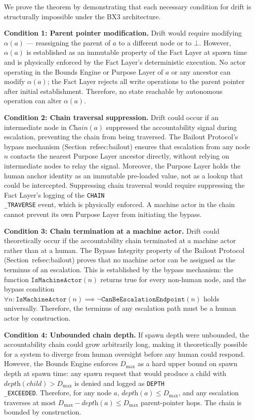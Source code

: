 \begin{Proof}
We prove the theorem by demonstrating that each necessary condition for drift is structurally impossible under the BX3 architecture.

\textbf{Condition 1: Parent pointer modification.} Drift would require modifying $\alpha(a)$ — reassigning the parent of $a$ to a different node or to $\bot$. However, $\alpha(a)$ is established as an immutable property of the Fact Layer at spawn time and is physically enforced by the Fact Layer's deterministic execution. No actor operating in the Bounds Engine or Purpose Layer of $a$ or any ancestor can modify $\alpha(a)$; the Fact Layer rejects all write operations to the parent pointer after initial establishment. Therefore, no state reachable by autonomous operation can alter $\alpha(a)$.

\textbf{Condition 2: Chain traversal suppression.} Drift could occur if an intermediate node in $\textit{Chain}(a)$ suppressed the accountability signal during escalation, preventing the chain from being traversed. The Bailout Protocol's bypass mechanism (Section~ref{sec:bailout}) ensures that escalation from any node $n$ contacts the nearest Purpose Layer ancestor directly, without relying on intermediate nodes to relay the signal. Moreover, the Purpose Layer holds the human anchor identity as an immutable pre-loaded value, not as a lookup that could be intercepted. Suppressing chain traversal would require suppressing the Fact Layer's logging of the \texttt{CHAIN\\_TRAVERSE} event, which is physically enforced. A machine actor in the chain cannot prevent its own Purpose Layer from initiating the bypass.

\textbf{Condition 3: Chain termination at a machine actor.} Drift could theoretically occur if the accountability chain terminated at a machine actor rather than at a human. The Bypass Integrity property of the Bailout Protocol (Section~ref{sec:bailout}) proves that no machine actor can be assigned as the terminus of an escalation. This is established by the bypass mechanism: the function $\texttt{IsMachineActor}(n)$ returns true for every non-human node, and the bypass condition $\forall n : \texttt{IsMachineActor}(n) \implies \lnot \texttt{CanBeEscalationEndpoint}(n)$ holds universally. Therefore, the terminus of any escalation path must be a human actor by construction.

\textbf{Condition 4: Unbounded chain depth.} If spawn depth were unbounded, the accountability chain could grow arbitrarily long, making it theoretically possible for a system to diverge from human oversight before any human could respond. However, the Bounds Engine enforces $D_{\max}$ as a hard upper bound on spawn depth at spawn time: any spawn request that would produce a child with $\textit{depth}(child) > D_{\max}$ is denied and logged as \texttt{DEPTH\\_EXCEEDED}. Therefore, for any node $a$, $\textit{depth}(a) \leq D_{\max}$, and any escalation traverses at most $D_{\max} - \textit{depth}(a) \leq D_{\max}$ parent-pointer hops. The chain is bounded by construction.


\end{Proof}
